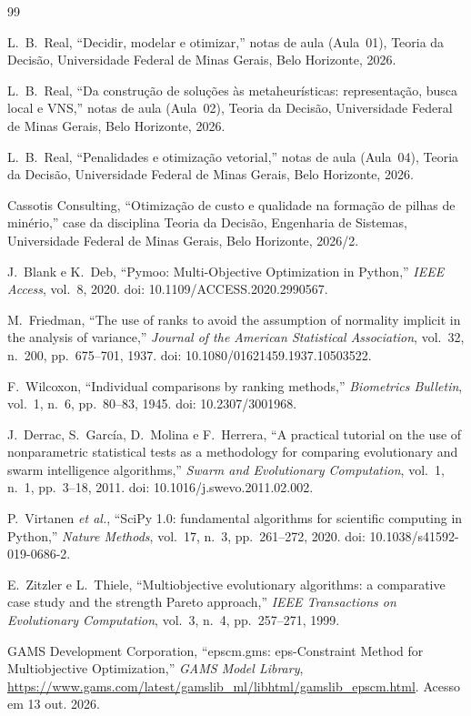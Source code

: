 \documentclass[conference]{IEEEtran}
\begin{document}
\begin{thebibliography}{99}

L.~B.~Real, ``Decidir, modelar e otimizar,'' notas de aula (Aula~01), Teoria da Decisão, Universidade Federal de Minas Gerais, Belo Horizonte, 2026.

L.~B.~Real, ``Da construção de soluções às metaheurísticas: representação, busca local e VNS,'' notas de aula (Aula~02), Teoria da Decisão, Universidade Federal de Minas Gerais, Belo Horizonte, 2026.

L.~B.~Real, ``Penalidades e otimização vetorial,'' notas de aula (Aula~04), Teoria da Decisão, Universidade Federal de Minas Gerais, Belo Horizonte, 2026.

Cassotis Consulting, ``Otimização de custo e qualidade na formação de pilhas de minério,'' case da disciplina Teoria da Decisão, Engenharia de Sistemas, Universidade Federal de Minas Gerais, Belo Horizonte, 2026/2.

J.~Blank e K.~Deb, ``Pymoo: Multi-Objective Optimization in Python,''
\textit{IEEE Access}, vol.~8, 2020. doi: 10.1109/ACCESS.2020.2990567.

M.~Friedman, ``The use of ranks to avoid the assumption of normality implicit
in the analysis of variance,'' \textit{Journal of the American Statistical
Association}, vol.~32, n.~200, pp.~675--701, 1937.
doi: 10.1080/01621459.1937.10503522.

F.~Wilcoxon, ``Individual comparisons by ranking methods,''
\textit{Biometrics Bulletin}, vol.~1, n.~6, pp.~80--83, 1945.
doi: 10.2307/3001968.

J.~Derrac, S.~García, D.~Molina e F.~Herrera, ``A practical tutorial on the use
of nonparametric statistical tests as a methodology for comparing evolutionary
and swarm intelligence algorithms,'' \textit{Swarm and Evolutionary
Computation}, vol.~1, n.~1, pp.~3--18, 2011. doi: 10.1016/j.swevo.2011.02.002.

P.~Virtanen \textit{et al.}, ``SciPy 1.0: fundamental algorithms for scientific
computing in Python,'' \textit{Nature Methods}, vol.~17, n.~3, pp.~261--272,
2020. doi: 10.1038/s41592-019-0686-2.

E.~Zitzler e L.~Thiele, ``Multiobjective evolutionary algorithms: a comparative
case study and the strength Pareto approach,'' \textit{IEEE Transactions on
Evolutionary Computation}, vol.~3, n.~4, pp.~257--271, 1999.

GAMS Development Corporation, ``epscm.gms: eps-Constraint Method for
Multiobjective Optimization,'' \textit{GAMS Model Library},
\url{https://www.gams.com/latest/gamslib_ml/libhtml/gamslib_epscm.html}.
Acesso em 13 out. 2026.

\end{thebibliography}
\end{document}
